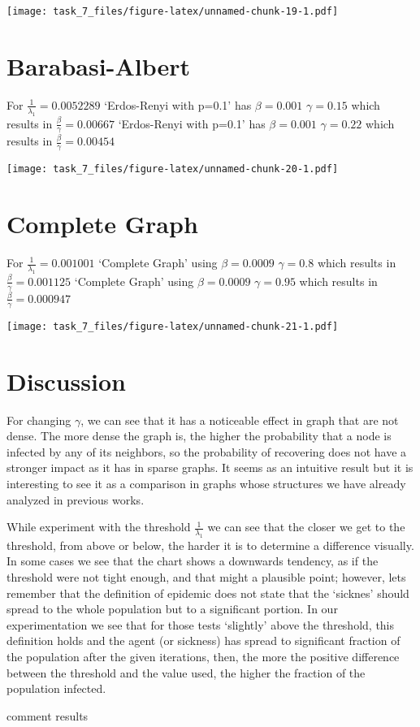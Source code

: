 \documentclass[]{article}
\begin{document}
\texttt{[image: task\_7\_files/figure-latex/unnamed-chunk-19-1.pdf]}

\section{Barabasi-Albert}\label{barabasi-albert}

For \(\frac{1}{\lambda_1} = 0.0052289\) `Erdos-Renyi with p=0.1' has
\(\beta = 0.001\) \(\gamma =0.15\) which results in
\(\frac{\beta}{\gamma} = 0.00667\) `Erdos-Renyi with p=0.1' has
\(\beta = 0.001\) \(\gamma =0.22\) which results in
\(\frac{\beta}{\gamma} = 0.00454\)

\texttt{[image: task\_7\_files/figure-latex/unnamed-chunk-20-1.pdf]}

\section{Complete Graph}\label{complete-graph}

For \(\frac{1}{\lambda_1} = 0.001001\) `Complete Graph' using
\(\beta = 0.0009\) \(\gamma =0.8\) which results in
\(\frac{\beta}{\gamma} = 0.001125\) `Complete Graph' using
\(\beta = 0.0009\) \(\gamma =0.95\) which results in
\(\frac{\beta}{\gamma} = 0.000947\)

\texttt{[image: task\_7\_files/figure-latex/unnamed-chunk-21-1.pdf]}

\section{Discussion}\label{discussion}

For changing \(\gamma\), we can see that it has a noticeable effect in
graph that are not dense. The more dense the graph is, the higher the
probability that a node is infected by any of its neighbors, so the
probability of recovering does not have a stronger impact as it has in
sparse graphs. It seems as an intuitive result but it is interesting to
see it as a comparison in graphs whose structures we have already
analyzed in previous works.

While experiment with the threshold \(\frac{1}{\lambda_1}\) we can see
that the closer we get to the threshold, from above or below, the harder
it is to determine a difference visually. In some cases we see that the
chart shows a downwards tendency, as if the threshold were not tight
enough, and that might a plausible point; however, lets remember that
the definition of epidemic does not state that the `sicknes' should
spread to the whole population but to a significant portion. In our
experimentation we see that for those tests `slightly' above the
threshold, this definition holds and the agent (or sickness) has spread
to significant fraction of the population after the given iterations,
then, the more the positive difference between the threshold and the
value used, the higher the fraction of the population infected.

comment results
\end{document}
